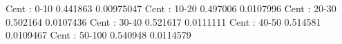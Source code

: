 Cent : 0-10
0.441863 0.00975047
Cent : 10-20
0.497006 0.0107996
Cent : 20-30
0.502164 0.0107436
Cent : 30-40
0.521617 0.0111111
Cent : 40-50
0.514581 0.0109467
Cent : 50-100
0.540948 0.0114579
